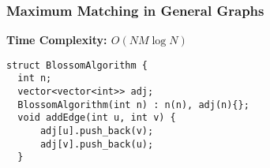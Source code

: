 \newpage

\subsubsection{Maximum Matching in General Graphs}

\textbf{Time Complexity: $O(NM\log{N})$}\\

\cite{Gabow1976Apr}

\begin{center}
\begin{minipage}[t]{0.45\linewidth}
\begin{lstlisting}
struct BlossomAlgorithm {
  int n;
  vector<vector<int>> adj;
  BlossomAlgorithm(int n) : n(n), adj(n){};
  void addEdge(int u, int v) {
      adj[u].push_back(v);
      adj[v].push_back(u);
  }


\end{lstlisting}
\end{minipage}
\end{center}
